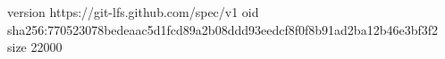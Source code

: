 version https://git-lfs.github.com/spec/v1
oid sha256:770523078bedeaac5d1fcd89a2b08ddd93eedcf8f0f8b91ad2ba12b46e3bf3f2
size 22000
